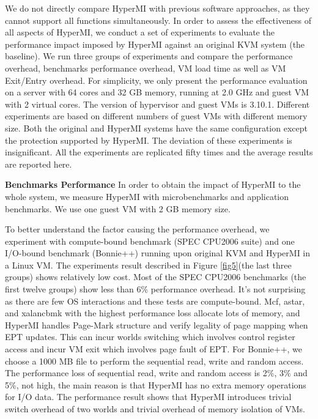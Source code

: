 \documentclass[conference]{IEEEtran}
\begin{document}
We do not directly compare HyperMI with previous software approaches, as they cannot support all functions simultaneously. In order to assess the effectiveness of all aspects of HyperMI, we conduct a set of experiments to evaluate the performance impact imposed by HyperMI against an original KVM system (the baseline). We run three groups of experiments and compare the performance overhead, benchmarks performance overhead, VM load time as well as VM Exit/Entry overhead.
For simplicity, we only present the performance evaluation on a server with 64 cores and 32 GB memory, running at 2.0 GHz and guest VM with 2 virtual cores. The version of hypervisor and guest VMs is 3.10.1. Different experiments are based on different numbers of guest VMs with different memory size. Both the original and HyperMI systems have the same configuration except the protection supported by HyperMI. The deviation of these experiments is insignificant. All the experiments are replicated fifty times and the average results are reported here.



\textbf{Benchmarks Performance}
In order to obtain the impact of HyperMI to the whole system, we measure HyperMI with microbenchmarks and application benchmarks. 
We use one guest VM with 2 GB memory size. 

To better understand the factor causing the performance overhead, we experiment with compute-bound benchmark (SPEC CPU2006 suite) and one I/O-bound benchmark (Bonnie++) running upon original KVM and HyperMI in a Linux VM. The experiments result described in Figure \ref{fig5}(the last three groups) shows relatively low cost. Most of the SPEC CPU2006 benchmarks (the first twelve groups) show less than 6\% performance overhead. It's not surprising as there are few OS interactions and these tests are compute-bound. Mcf, astar, and xalancbmk with the highest performance loss allocate lots of memory, and HyperMI handles Page-Mark structure and verify legality of page mapping when EPT updates. This can incur worlds switching which involves control register access and incur VM exit which involves page fault of EPT.
 For Bonnie++, we choose a 1000 MB file to perform the sequential read, write and random access. The performance loss of sequential read, write and random access is 2\%, 3\% and 5\%, not high, the main reason is that HyperMI has no extra memory operations for I/O data. The performance result shows that HyperMI introduces trivial switch overhead of two worlds and trivial overhead of memory isolation of VMs.
\end{document}
